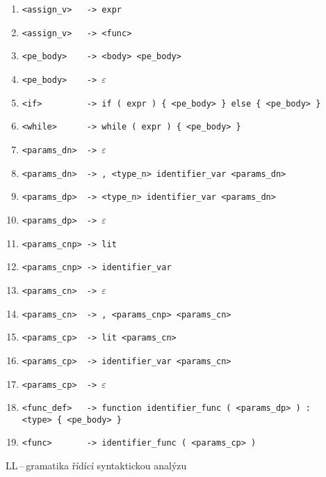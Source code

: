 \documentclass[a4paper,12pt]{article}
\begin{document}
\begin{table}[!ht]
\begin{enumerate}[noitemsep]
		\item \verb|<assign_v>   -> expr|
		\item \verb|<assign_v>   -> <func>|
		      		      		      		      		              
		\item \verb|<pe_body>    -> <body> <pe_body>|
		\item \verb|<pe_body>    -> |$\varepsilon$
		      		      		      		      		      		      		      	    
		\item \verb|<if>         -> if ( expr ) { <pe_body> } else { <pe_body> }|
		\item \verb|<while>      -> while ( expr ) { <pe_body> }|
		      		      		      		      		      		      		    	    
		\item \verb|<params_dn>  -> |$\varepsilon$
		\item \verb|<params_dn>  -> , <type_n> identifier_var <params_dn>|
		      		      		      		      		              
		\item \verb|<params_dp>  -> <type_n> identifier_var <params_dn>|
		\item \verb|<params_dp>  -> |$\varepsilon$
		      		      		      
		\item \verb|<params_cnp> -> lit|
		\item \verb|<params_cnp> -> identifier_var|
		      		      		      		      		              
		\item \verb|<params_cn>  -> |$\varepsilon$
		\item \verb|<params_cn>  -> , <params_cnp> <params_cn>|
		         		      		              
		\item \verb|<params_cp>  -> lit <params_cn>|
		\item \verb|<params_cp>  -> identifier_var <params_cn>|
		\item \verb|<params_cp>  -> |$\varepsilon$
		      		      		      		      		      		      		      	    
		\item \verb|<func_def>   -> function identifier_func ( <params_dp> ) :| 
		      \newline \verb |               <type> { <pe_body> }|
		\item \verb|<func>       -> identifier_func ( <params_cp> )|
		      		      		      		      		      		      		      	    
	\end{enumerate}
	\caption{LL\,--\,gramatika řídící syntaktickou analýzu}
	\label{table:ll-gramatika}
\end{table}
\clearpage
\end{document}
